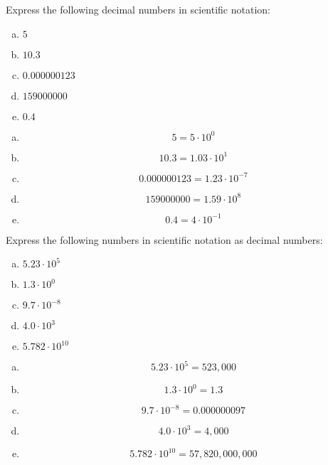\documentclass[11pt,letterpaper]{article}
\begin{document}

 Express the following decimal numbers in scientific notation:
	\begin{enumerate}[(a)]
	\item $5$
	\item $10.3$
	\item $0.000000123$
	\item $159000000$
	\item $0.4$
	\end{enumerate} \pspace

\sol 
\begin{enumerate}[(a)]
\item 
	\[
	5= 5 \cdot 10^0
	\] \pspace

\item 
	\[
	10.3= 1.03 \cdot 10^1
	\] \pspace
 
\item 
	\[
	0.000000123= 1.23 \cdot 10^{-7}
	\] \pspace
 
\item 
	\[
	159000000= 1.59 \cdot 10^8
	\] \pspace
 
\item 
	\[
	0.4= 4 \cdot 10^{-1}
	\] 
\end{enumerate}



\newpage



 Express the following numbers in scientific notation as decimal numbers:
	\begin{enumerate}[(a)]
	\item $5.23 \cdot 10^5$
	\item $1.3 \cdot 10^0$
	\item $9.7 \cdot 10^{-8}$
	\item $4.0 \cdot 10^3$
	\item $5.782 \cdot 10^{10}$
	\end{enumerate} \pspace

\sol 
\begin{enumerate}[(a)]
\item 
	\[
	5.23 \cdot 10^5= 523,\!000
	\] \pspace

\item 
	\[
	1.3 \cdot 10^0= 1.3
	\] \pspace

\item 
	\[
	9.7 \cdot 10^{-8}= 0.000000097
	\] \pspace

\item 
	\[
	4.0 \cdot 10^3= 4,\!000
	\] \pspace

\item 
	\[
	5.782 \cdot 10^{10}= 57,\!820,\!000,\!000
	\] 
\end{enumerate}
\end{document}
